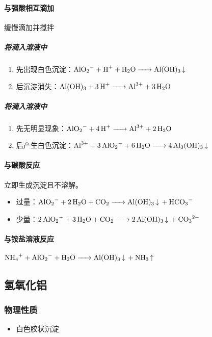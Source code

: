 \documentclass[a4paper]{article}
\begin{document}
	\paragraph{与强酸相互滴加}缓慢滴加并搅拌
	\subparagraph{将滴入溶液中}
	\begin{enumerate}
		\item 先出现白色沉淀：$\ce{AlO2- + H+ + H2O -> Al(OH)3 v}\\$
		\item 后沉淀消失：$\ce{Al(OH)3 + 3H+ -> Al^3+ + 3H2O}\\$
	\end{enumerate}
	\subparagraph{将滴入溶液中}
	\begin{enumerate}
		\item 先无明显现象：$\ce{AlO2- + 4H+ -> Al^3+ + 2H2O}\\$
		\item 后产生白色沉淀：$\ce{Al^3+ + 3AlO2- + 6H2O -> 4Al3(OH)3 v}\\$
	\end{enumerate}
	\paragraph{与碳酸反应}
	立即生成沉淀且不溶解。
	\begin{itemize}
		\item {}过量：$\ce{AlO2- + 2H2O + CO2 -> Al(OH)3 v + HCO3-}\\$
		\item {}少量：$\ce{2AlO2- + 3H2O + CO2 -> 2Al(OH)3 v + CO3^2-}\\$
	\end{itemize}
	\paragraph{与铵盐溶液反应}
	$\ce{NH4+ + AlO2- + H2O -> Al(OH)3 v + NH3 ^}\\$
	
	\subsection{氢氧化铝}
	\subsubsection{物理性质}
	\begin{itemize}
		\item 白色胶状沉淀
	\end{itemize}
\end{document}
